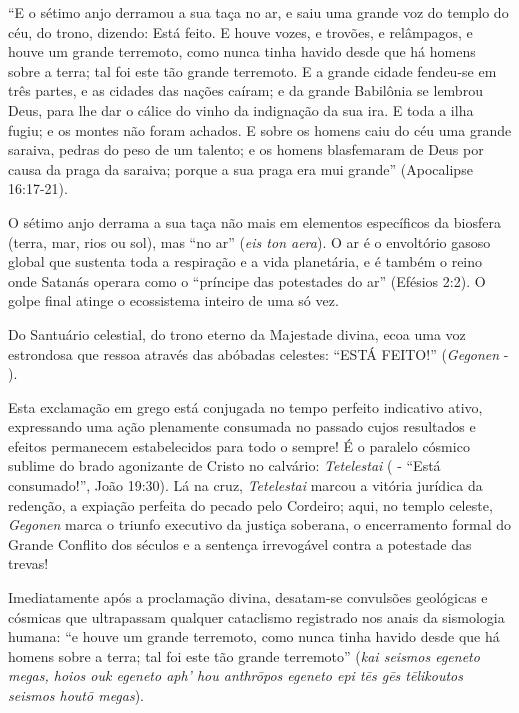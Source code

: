 \documentclass[11pt,a4paper,openany]{book}
\begin{document}
``E o sétimo anjo derramou a sua taça no ar, e saiu uma grande voz do templo do céu, do trono, dizendo: Está feito. E houve vozes, e trovões, e relâmpagos, e houve um grande terremoto, como nunca tinha havido desde que há homens sobre a terra; tal foi este tão grande terremoto. E a grande cidade fendeu-se em três partes, e as cidades das nações caíram; e da grande Babilônia se lembrou Deus, para lhe dar o cálice do vinho da indignação da sua ira. E toda a ilha fugiu; e os montes não foram achados. E sobre os homens caiu do céu uma grande saraiva, pedras do peso de um talento; e os homens blasfemaram de Deus por causa da praga da saraiva; porque a sua praga era mui grande'' (Apocalipse 16:17-21).

O sétimo anjo derrama a sua taça não mais em elementos específicos da biosfera (terra, mar, rios ou sol), mas ``no ar'' (\textit{eis ton aera}). O ar é o envoltório gasoso global que sustenta toda a respiração e a vida planetária, e é também o reino onde Satanás operara como o ``príncipe das potestades do ar'' (Efésios 2:2). O golpe final atinge o ecossistema inteiro de uma só vez.

Do Santuário celestial, do trono eterno da Majestade divina, ecoa uma voz estrondosa que ressoa através das abóbadas celestes:
``ESTÁ FEITO!'' (\textit{Gegonen} - ).

Esta exclamação em grego está conjugada no tempo perfeito indicativo ativo, expressando uma ação plenamente consumada no passado cujos resultados e efeitos permanecem estabelecidos para todo o sempre! É o paralelo cósmico sublime do brado agonizante de Cristo no calvário: \textit{Tetelestai} ( - ``Está consumado!'', João 19:30). Lá na cruz, \textit{Tetelestai} marcou a vitória jurídica da redenção, a expiação perfeita do pecado pelo Cordeiro; aqui, no templo celeste, \textit{Gegonen} marca o triunfo executivo da justiça soberana, o encerramento formal do Grande Conflito dos séculos e a sentença irrevogável contra a potestade das trevas!

Imediatamente após a proclamação divina, desatam-se convulsões geológicas e cósmicas que ultrapassam qualquer cataclismo registrado nos anais da sismologia humana:
``e houve um grande terremoto, como nunca tinha havido desde que há homens sobre a terra; tal foi este tão grande terremoto'' (\textit{kai seismos egeneto megas, hoios ouk egeneto aph' hou anthrōpos egeneto epi tēs gēs tēlikoutos seismos houtō megas}).
\end{document}
